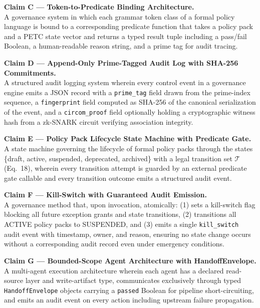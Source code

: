 \documentclass[12pt,letterpaper]{article}
\theoremstyle{definition}
\theoremstyle{remark}
\begin{document}
\begin{claimbox}
\textbf{Claim C — Token-to-Predicate Binding Architecture.}\\
A governance system in which each grammar token class of a formal policy language is
bound to a corresponding predicate function that takes a policy pack and a PETC state
vector and returns a typed result tuple including a pass/fail Boolean, a human-readable
reason string, and a prime tag for audit tracing.
\end{claimbox}

\begin{claimbox}
\textbf{Claim D — Append-Only Prime-Tagged Audit Log with SHA-256 Commitments.}\\
A structured audit logging system wherein every control event in a governance engine
emits a JSON record with a \texttt{prime\_tag} field drawn from the prime-index
sequence, a \texttt{fingerprint} field computed as SHA-256 of the canonical
serialization of the event, and a \texttt{circom\_proof} field optionally holding a
cryptographic witness hash from a zk-SNARK circuit verifying association integrity.
\end{claimbox}

\begin{claimbox}
\textbf{Claim E — Policy Pack Lifecycle State Machine with Predicate Gate.}\\
A state machine governing the lifecycle of formal policy packs through the states
\{draft, active, suspended, deprecated, archived\} with a legal transition set
\(\mathcal{T}\) (Eq.\ 18), wherein every transition attempt is guarded by an external
predicate gate callable and every transition outcome emits a structured audit event.
\end{claimbox}

\begin{claimbox}
\textbf{Claim F — Kill-Switch with Guaranteed Audit Emission.}\\
A governance method that, upon invocation, atomically: (1) sets a kill-switch flag
blocking all future exception grants and state transitions, (2) transitions all
ACTIVE policy packs to SUSPENDED, and (3) emits a single \texttt{kill\_switch} audit
event with timestamp, owner, and reason, ensuring no state change occurs without
a corresponding audit record even under emergency conditions.
\end{claimbox}

\begin{claimbox}
\textbf{Claim G — Bounded-Scope Agent Architecture with HandoffEnvelope.}\\
A multi-agent execution architecture wherein each agent has a declared read-source layer
and write-artifact type, communicates exclusively through typed \texttt{HandoffEnvelope}
objects carrying a \texttt{passed} Boolean for pipeline short-circuiting, and emits an
audit event on every action including upstream failure propagation.
\end{claimbox}
\end{document}
